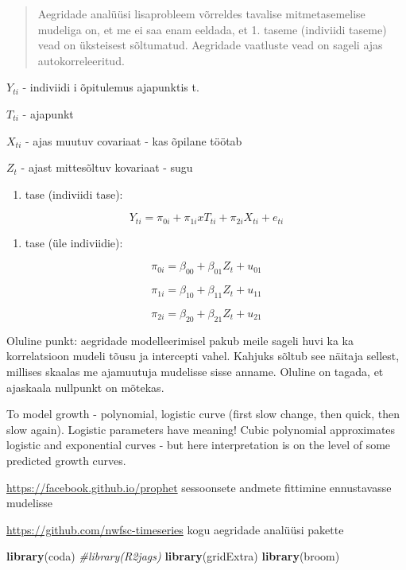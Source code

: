 \documentclass[]{book}
\newenvironment{Shaded}{\begin{snugshade}}{\end{snugshade}}
\newcommand{\KeywordTok}[1]{\textcolor[rgb]{0.13,0.29,0.53}{\textbf{#1}}}
\newcommand{\CommentTok}[1]{\textcolor[rgb]{0.56,0.35,0.01}{\textit{#1}}}
\newcommand{\NormalTok}[1]{#1}
\providecommand{\tightlist}{%
  \setlength{\itemsep}{0pt}\setlength{\parskip}{0pt}}
\begin{document}
\begin{quote}
Aegridade analüüsi lisaprobleem võrreldes tavalise mitmetasemelise
mudeliga on, et me ei saa enam eeldada, et 1. taseme (indiviidi taseme)
vead on üksteisest sõltumatud. Aegridade vaatluste vead on sageli ajas
autokorreleeritud.
\end{quote}

\(Y_{ti}\) - indiviidi i õpitulemus ajapunktis t.

\(T_{ti}\) - ajapunkt

\(X_{ti}\) - ajas muutuv covariaat - kas õpilane töötab

\(Z_t\) - ajast mittesõltuv kovariaat - sugu

\begin{enumerate}
\def\labelenumi{\arabic{enumi}.}
\tightlist
\item
  tase (indiviidi tase):
\end{enumerate}

\[Y_{ti} = \pi_{0i} + \pi_{1i} x T_{ti} + \pi_{2i} X_{ti} + e_{ti} \]

\begin{enumerate}
\def\labelenumi{\arabic{enumi}.}
\setcounter{enumi}{1}
\tightlist
\item
  tase (üle indiviidie):
\end{enumerate}

\[\pi_{0i} = \beta_{00} + \beta_{01} Z_t + u_{01}\]

\[\pi_{1i} =\beta_{10} + \beta_{11} Z_t + u_{11}\]

\[\pi_{2i} = \beta_{20} + \beta_{21} Z_t + u_{21}\]

Oluline punkt: aegridade modelleerimisel pakub meile sageli huvi ka ka
korrelatsioon mudeli tõusu ja intercepti vahel. Kahjuks sõltub see
näitaja sellest, millises skaalas me ajamuutuja mudelisse sisse anname.
Oluline on tagada, et ajaskaala nullpunkt on mõtekas.

To model growth - polynomial, logistic curve (first slow change, then
quick, then slow again). Logistic parameters have meaning! Cubic
polynomial approximates logistic and exponential curves - but here
interpretation is on the level of some predicted growth curves.

\url{https://facebook.github.io/prophet} sessoonsete andmete fittimine
ennustavasse mudelisse

\url{https://github.com/nwfsc-timeseries} kogu aegridade analüüsi
pakette

\begin{Shaded}
\begin{Highlighting}[]
\KeywordTok{library}\NormalTok{(coda)}
\CommentTok{#library(R2jags)}
\KeywordTok{library}\NormalTok{(gridExtra)}
\KeywordTok{library}\NormalTok{(broom)}
\end{Highlighting}
\end{Shaded}
\end{document}
